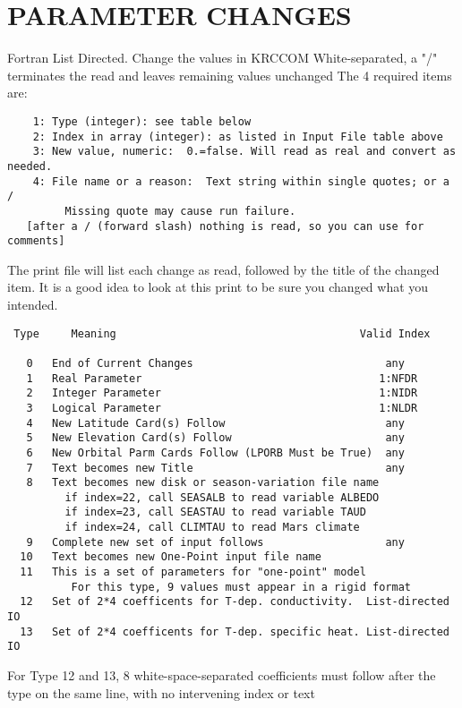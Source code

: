 \documentclass[draft]{article}  %
\begin{document}
\section{PARAMETER CHANGES \label{pc}}

Fortran List Directed.  Change the values in KRCCOM	
White-separated, a "/" terminates the read and leaves remaining values unchanged
The 4 required items are:
\vspace{-3.mm} 
\begin{verbatim}
    1: Type (integer): see table below
    2: Index in array (integer): as listed in Input File table above
    3: New value, numeric:  0.=false. Will read as real and convert as needed.
    4: File name or a reason:  Text string within single quotes; or a /
         Missing quote may cause run failure.
   [after a / (forward slash) nothing is read, so you can use for comments]
\end{verbatim}
The print file will list each change as read, followed by the title of the
changed item. It is a good idea to look at this print to be sure you changed
what you intended.
\vspace{-3.mm} 
\begin{verbatim}
 Type     Meaning                                      Valid Index

   0   End of Current Changes                              any
   1   Real Parameter                                     1:NFDR
   2   Integer Parameter                                  1:NIDR
   3   Logical Parameter                                  1:NLDR
   4   New Latitude Card(s) Follow                         any
   5   New Elevation Card(s) Follow                        any
   6   New Orbital Parm Cards Follow (LPORB Must be True)  any
   7   Text becomes new Title                              any
   8   Text becomes new disk or season-variation file name
         if index=22, call SEASALB to read variable ALBEDO
         if index=23, call SEASTAU to read variable TAUD
         if index=24, call CLIMTAU to read Mars climate
   9   Complete new set of input follows                   any
  10   Text becomes new One-Point input file name
  11   This is a set of parameters for "one-point" model 
          For this type, 9 values must appear in a rigid format
  12   Set of 2*4 coefficents for T-dep. conductivity.  List-directed IO
  13   Set of 2*4 coefficents for T-dep. specific heat. List-directed IO 
\end{verbatim}

For Type 12 and 13, 8 white-space-separated coefficients must follow after 
the type on the same line, with no intervening index or text 
\end{document}
